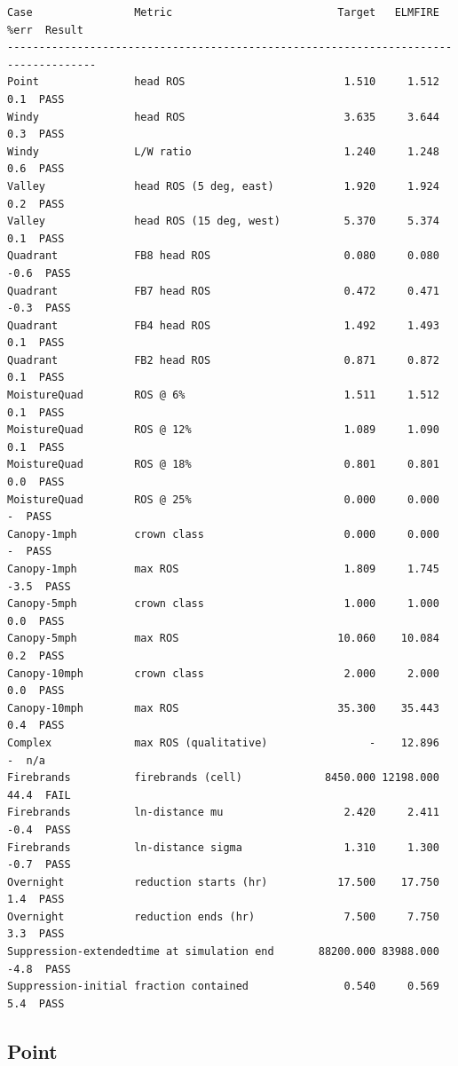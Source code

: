 \begin{verbatim}
Case                Metric                          Target   ELMFIRE    %err  Result
------------------------------------------------------------------------------------
Point               head ROS                         1.510     1.512     0.1  PASS
Windy               head ROS                         3.635     3.644     0.3  PASS
Windy               L/W ratio                        1.240     1.248     0.6  PASS
Valley              head ROS (5 deg, east)           1.920     1.924     0.2  PASS
Valley              head ROS (15 deg, west)          5.370     5.374     0.1  PASS
Quadrant            FB8 head ROS                     0.080     0.080    -0.6  PASS
Quadrant            FB7 head ROS                     0.472     0.471    -0.3  PASS
Quadrant            FB4 head ROS                     1.492     1.493     0.1  PASS
Quadrant            FB2 head ROS                     0.871     0.872     0.1  PASS
MoistureQuad        ROS @ 6%                         1.511     1.512     0.1  PASS
MoistureQuad        ROS @ 12%                        1.089     1.090     0.1  PASS
MoistureQuad        ROS @ 18%                        0.801     0.801     0.0  PASS
MoistureQuad        ROS @ 25%                        0.000     0.000       -  PASS
Canopy-1mph         crown class                      0.000     0.000       -  PASS
Canopy-1mph         max ROS                          1.809     1.745    -3.5  PASS
Canopy-5mph         crown class                      1.000     1.000     0.0  PASS
Canopy-5mph         max ROS                         10.060    10.084     0.2  PASS
Canopy-10mph        crown class                      2.000     2.000     0.0  PASS
Canopy-10mph        max ROS                         35.300    35.443     0.4  PASS
Complex             max ROS (qualitative)                -    12.896       -  n/a
Firebrands          firebrands (cell)             8450.000 12198.000    44.4  FAIL
Firebrands          ln-distance mu                   2.420     2.411    -0.4  PASS
Firebrands          ln-distance sigma                1.310     1.300    -0.7  PASS
Overnight           reduction starts (hr)           17.500    17.750     1.4  PASS
Overnight           reduction ends (hr)              7.500     7.750     3.3  PASS
Suppression-extendedtime at simulation end       88200.000 83988.000    -4.8  PASS
Suppression-initial fraction contained               0.540     0.569     5.4  PASS
\end{verbatim}

\clearpage
\subsection{Point}

